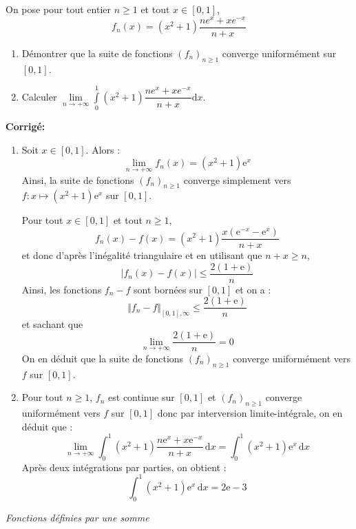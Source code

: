 \documentclass[a4paper,twoside,french,11pt]{VcCours}
\newcommand{\corr}{\textbf{Corrigé:}}
\begin{document}
\medskip


\begin{Exercice}{} On pose pour tout entier $n \geq 1$ et tout $x \in [0,1]$,
$$f_{n}\left( x\right) =\left( x^{2}+1\right) \dfrac{ne^{x}+xe^{-x}}{n+x} $$

\begin{enumerate}
\item Démontrer que la suite de fonctions $\left( f_{n}\right) _{n \geq 1}$ converge uniformément sur $[0,1]$.
\item Calculer $\underset{n\rightarrow +\infty }{\lim }\int\limits_{0}^{1}\left( x^{2}+1\right) \dfrac{ne^{x}+xe^{-x}}{n+x}\text{d}x$.
\end{enumerate}
\end{Exercice} 

\corr \begin{enumerate}
\item Soit $x \in \left[ {0,1} \right]$. Alors :
$$\lim\limits_{n\to +\infty}^{}f_n (x)=(x^2  + 1){\mathrm{e}}^x $$
Ainsi, la suite de fonctions $(f_n)_{n \geq 1}$ converge simplement vers $f:x \mapsto (x^2  + 1){\mathrm{e}}^x $ sur $\left[ {0,1} \right]$.
\medskip

Pour tout $x\in \left[ 0,1\right]$ et tout $n \geq 1$, 
$$f_n (x) - f(x) = (x^2  + 1)\dfrac{{x({\mathrm{e}}^{ - x}  - {\mathrm{e}}^x )}}{{n + x}}$$
et donc d'après l'inégalité triangulaire et en utilisant que $n+x \geq n$,
$$\left| {f_n (x) - f(x)} \right| \leq \dfrac{{2(1+\textrm{e})}}{n}$$
Ainsi, les fonctions $f_n-f$ sont bornées sur $[0,1]$ et on a :
$$ \Vert f_n -f \Vert_{[0,1], \infty} \leq \dfrac{{2(1+\textrm{e})}}{n}$$
et sachant que 
$$ \lim_{n \rightarrow + \infty} \dfrac{{2(1+\textrm{e})}}{n} = 0 $$
On en déduit que la suite de fonctions $(f_n)_{n \geq 1}$ converge uniformément vers $f$ sur $\left[ {0,1} \right]$.
\item Pour tout $n \geq 1$, $f_n$ est continue sur $[0,1]$ et $(f_n)_{n \geq 1}$ converge uniformément vers $f$ sur $\left[ {0,1} \right]$ donc par interversion limite-intégrale, on en déduit que :
$$\mathop {\lim }\limits_{n \to  + \infty } \int_0^1 {(x^2  + 1)\dfrac{{n{\mathrm{e}}^x  + x{\mathrm{e}}^{ - x} }}{{n + x}}\,{\mathrm{d}}x}  = \int_0^1 {(x^2  + 1){\mathrm{e}}^x \,{\mathrm{d}}x} $$
Après deux intégrations par parties, on obtient :
$$\int_0^1 {(x^2  + 1){\mathrm{e}}^x \,{\mathrm{d}}x}  = 2{\mathrm{e}} - 3$$
\end{enumerate}


\medskip

\begin{center}
\textit{{ {\large Fonctions définies par une somme}}}
\end{center}
\end{document}
